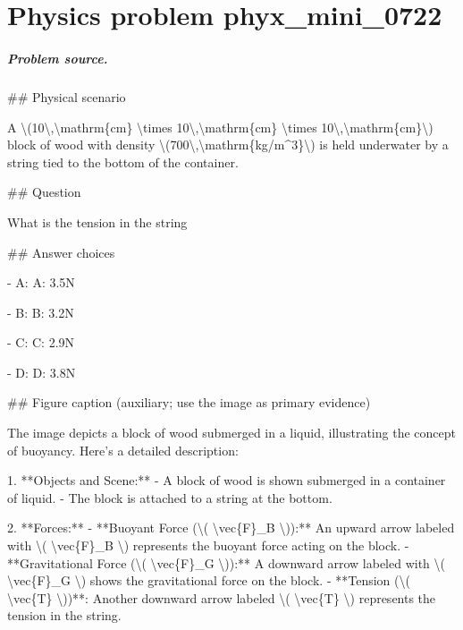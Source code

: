 
\chapter{Physics problem phyx\_mini\_0722}
\label{ch:PhyXMiniProblems_problem_phyx_mini_0722}

\paragraph{Problem source.}
\#\# Physical scenario

A \textbackslash{}(10\textbackslash{},\textbackslash{}mathrm\{cm\} \textbackslash{}times 10\textbackslash{},\textbackslash{}mathrm\{cm\} \textbackslash{}times 10\textbackslash{},\textbackslash{}mathrm\{cm\}\textbackslash{}) block of wood with density \textbackslash{}(700\textbackslash{},\textbackslash{}mathrm\{kg/m\textasciicircum{}3\}\textbackslash{}) is held underwater by a string tied to the bottom of the container.

\#\# Question

What is the tension in the string

\#\# Answer choices

- A: A: 3.5N

- B: B: 3.2N

- C: C: 2.9N

- D: D: 3.8N

\#\# Figure caption (auxiliary; use the image as primary evidence)

The image depicts a block of wood submerged in a liquid, illustrating the concept of buoyancy. Here's a detailed description:

1. **Objects and Scene:**
   - A block of wood is shown submerged in a container of liquid.
   - The block is attached to a string at the bottom.

2. **Forces:**
   - **Buoyant Force (\textbackslash{}( \textbackslash{}vec\{F\}\_B \textbackslash{})):** An upward arrow labeled with \textbackslash{}( \textbackslash{}vec\{F\}\_B \textbackslash{}) represents the buoyant force acting on the block.
   - **Gravitational Force (\textbackslash{}( \textbackslash{}vec\{F\}\_G \textbackslash{})):** A downward arrow labeled with \textbackslash{}( \textbackslash{}vec\{F\}\_G \textbackslash{}) shows the gravitational force on the block.
   - **Tension (\textbackslash{}( \textbackslash{}vec\{T\} \textbackslash{}))**: Another downward arrow labeled \textbackslash{}( \textbackslash{}vec\{T\} \textbackslash{}) represents the tension in the string.

